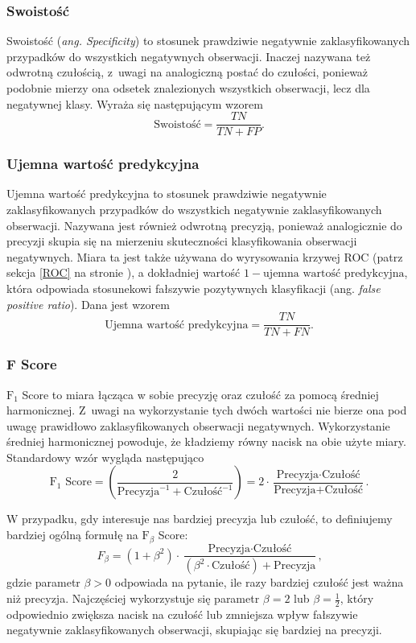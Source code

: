 \documentclass[inzynierska]{pwr_wmat_praca_dyplomowa}
\theoremstyle{plain}
\numberwithin{theorem}{chapter}
\theoremstyle{definition}
\numberwithin{theorem}{chapter}
\begin{document}
\subsubsection{Swoistość}
Swoistość (\textit{ang. Specificity}) to stosunek prawdziwie negatywnie zaklasyfikowanych przypadków do wszystkich negatywnych obserwacji. Inaczej nazywana też odwrotną czułością, z~uwagi na analogiczną postać do czułości, ponieważ podobnie mierzy ona odsetek znalezionych wszystkich obserwacji, lecz dla negatywnej klasy. Wyraża się następującym wzorem
$$ \text{Swoistość}= \frac{TN}{TN + FP} \text{.}$$

\subsubsection{Ujemna wartość predykcyjna}
Ujemna wartość predykcyjna to stosunek prawdziwie negatywnie zaklasyfikowanych przypadków do wszystkich negatywnie zaklasyfikowanych obserwacji. Nazywana jest również odwrotną precyzją, ponieważ analogicznie do precyzji skupia się na mierzeniu skuteczności klasyfikowania obserwacji negatywnych. Miara ta jest także używana do wyrysowania krzywej ROC (patrz sekcja \ref{ROC} na stronie \pageref{ROC}), a dokładniej wartość $1- \text{ujemna wartość predykcyjna}$, która odpowiada stosunekowi fałszywie pozytywnych klasyfikacji (ang. \textit{false positive ratio}). Dana jest wzorem
$$ \text{Ujemna wartość predykcyjna}= \frac{TN}{TN + FN} \text{.}$$

\subsubsection{F Score}
$\text{F}_1$ Score to miara łącząca w sobie precyzję oraz czułość za pomocą średniej harmonicznej. Z~uwagi na wykorzystanie tych dwóch wartości nie bierze ona pod uwagę prawidłowo zaklasyfikowanych obserwacji negatywnych. Wykorzystanie średniej harmonicznej powoduje, że kładziemy równy nacisk na obie użyte miary. Standardowy wzór wygląda następująco
$$ \text{F}_1 \text{ Score} = \left(\frac{2}{\text{Precyzja}^{-1} + \text{Czułość}^{-1}}\right) = 2 \cdot \frac{\text{Precyzja} \cdot \text{Czułość}}{\text{Precyzja} + \text{Czułość}} \text{.}$$

W przypadku, gdy interesuje nas bardziej precyzja lub czułość, to definiujemy bardziej ogólną formułę na $\text{F}_{\beta}$ Score:
$$ F_{\beta} = (1 + \beta^2) \cdot \frac{\text{Precyzja} \cdot \text{Czułość}}{(\beta^2 \cdot \text{Czułość}) + \text{Precyzja}} \text{,}$$
gdzie parametr $\beta>0$ odpowiada na pytanie, ile razy bardziej czułość jest ważna niż precyzja. Najczęściej wykorzystuje się parametr $\beta = 2$ lub $\beta = \frac{1}{2}$, który odpowiednio zwiększa nacisk na czułość lub zmniejsza wpływ fałszywie negatywnie zaklasyfikowanych obserwacji, skupiając się bardziej na precyzji.
\end{document}
